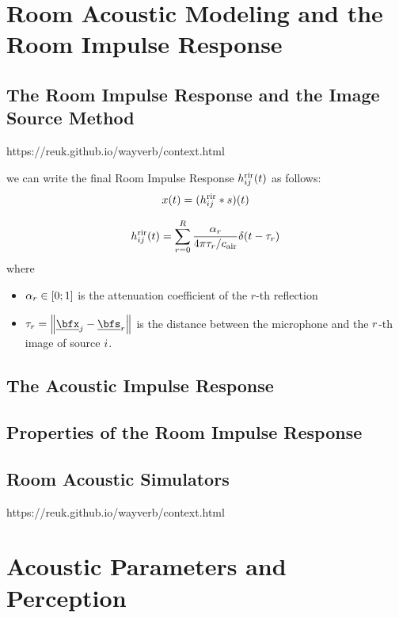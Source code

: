 \section{Room Acoustic Modeling and the Room Impulse Response}

\subsection{The Room Impulse Response and the Image Source Method}
https://reuk.github.io/wayverb/context.html

 we can write the final Room Impulse Response $h^{\text{rir}}_{ij}(t)$ as follows:
\begin{equation}
    x(t) = (h^{\text{rir}}_{ij} \ast s)(t)
\end{equation}

\begin{equation}
    \rir_{ij}(t) = \sum_{r=0}^{R} \frac{\alpha_r}{4 \pi \tau_r / \cair} \delta \kparen{t - \tau_r}
\end{equation}
where
\begin{itemize}
    \item $\alpha_r \in \kintervcc{0}{1}$ is the attenuation coefficient of the $r$-th reflection
    \item $\tau_r = \norm{\positionMicrophone_\idxMic - \positionSource_\idxEch}$ is the distance between the microphone and the $r$-th image of source $i$.
\end{itemize}



\subsection{The Acoustic Impulse Response}

\subsection{Properties of the Room Impulse Response}

\subsection{Room Acoustic Simulators}
https://reuk.github.io/wayverb/context.html

\section{Acoustic Parameters and Perception}
